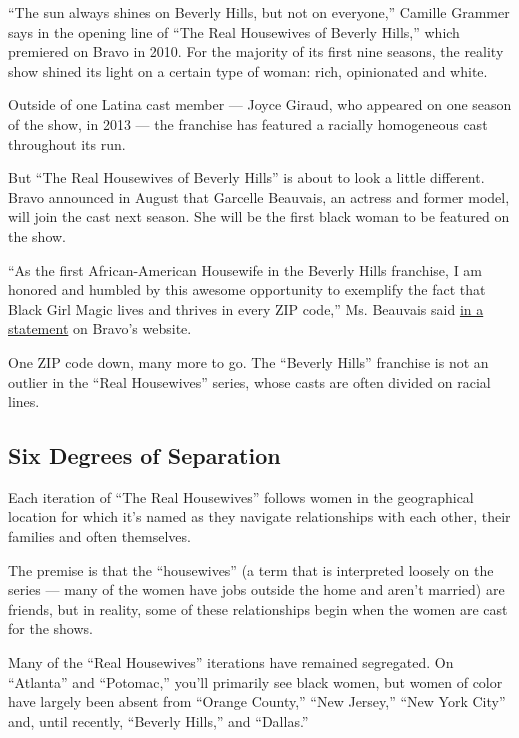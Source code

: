 ``The sun always shines on Beverly Hills, but not on everyone,'' Camille
Grammer says in the opening line of ``The Real Housewives of Beverly
Hills,'' which premiered on Bravo in 2010. For the majority of its first
nine seasons, the reality show shined its light on a certain type of
woman: rich, opinionated and white.

Outside of one Latina cast member --- Joyce Giraud, who appeared on one
season of the show, in 2013 --- the franchise has featured a racially
homogeneous cast throughout its run.

But ``The Real Housewives of Beverly Hills'' is about to look a little
different. Bravo announced in August that Garcelle Beauvais, an actress
and former model, will join the cast next season. She will be the first
black woman to be featured on the show.

``As the first African-American Housewife in the Beverly Hills
franchise, I am honored and humbled by this awesome opportunity to
exemplify the fact that Black Girl Magic lives and thrives in every ZIP
code,'' Ms. Beauvais said
\href{https://www.bravotv.com/the-daily-dish/the-real-housewives-of-beverly-hills-season-10-cast-garcelle-beauvais-sutton-stracke}{in
a statement} on Bravo's website.

One ZIP code down, many more to go. The ``Beverly Hills'' franchise is
not an outlier in the ``Real Housewives'' series, whose casts are often
divided on racial lines.

\hypertarget{six-degrees-of-separation}{%
\subsection{Six Degrees of Separation}\label{six-degrees-of-separation}}

Each iteration of ``The Real Housewives'' follows women in the
geographical location for which it's named as they navigate
relationships with each other, their families and often themselves.

The premise is that the ``housewives'' (a term that is interpreted
loosely on the series --- many of the women have jobs outside the home
and aren't married) are friends, but in reality, some of these
relationships begin when the women are cast for the shows.

Many of the ``Real Housewives'' iterations have remained segregated. On
``Atlanta'' and ``Potomac,'' you'll primarily see black women, but women
of color have largely been absent from ``Orange County,'' ``New
Jersey,'' ``New York City'' and, until recently, ``Beverly Hills,'' and
``Dallas.''

